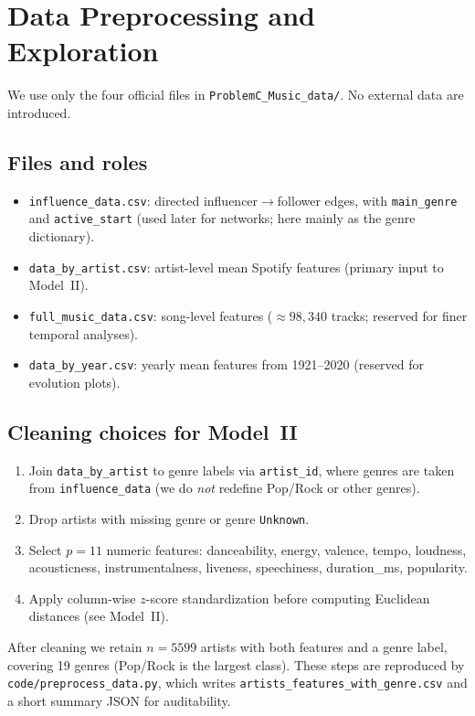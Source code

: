 \section{Data Preprocessing and Exploration}\label{sec:data}

We use only the four official files in \texttt{ProblemC\_Music\_data/}.
No external data are introduced.

\subsection{Files and roles}
\begin{itemize}
  \item \texttt{influence\_data.csv}: directed influencer$\to$follower edges, with \texttt{main\_genre} and \texttt{active\_start} (used later for networks; here mainly as the genre dictionary).
  \item \texttt{data\_by\_artist.csv}: artist-level mean Spotify features (primary input to Model~II).
  \item \texttt{full\_music\_data.csv}: song-level features ($\approx 98{,}340$ tracks; reserved for finer temporal analyses).
  \item \texttt{data\_by\_year.csv}: yearly mean features from 1921--2020 (reserved for evolution plots).
\end{itemize}

\subsection{Cleaning choices for Model~II}
\begin{enumerate}
  \item Join \texttt{data\_by\_artist} to genre labels via \texttt{artist\_id}, where genres are taken from \texttt{influence\_data} (we do \emph{not} redefine Pop/Rock or other genres).
  \item Drop artists with missing genre or genre \texttt{Unknown}.
  \item Select $p=11$ numeric features:
  danceability, energy, valence, tempo, loudness, acousticness, instrumentalness, liveness, speechiness, duration\_ms, popularity.
  \item Apply column-wise $z$-score standardization before computing Euclidean distances (see Model~II).
\end{enumerate}
After cleaning we retain $n=5599$ artists with both features and a genre label, covering 19 genres (Pop/Rock is the largest class).
These steps are reproduced by \texttt{code/preprocess\_data.py}, which writes \texttt{artists\_features\_with\_genre.csv} and a short summary JSON for auditability.
